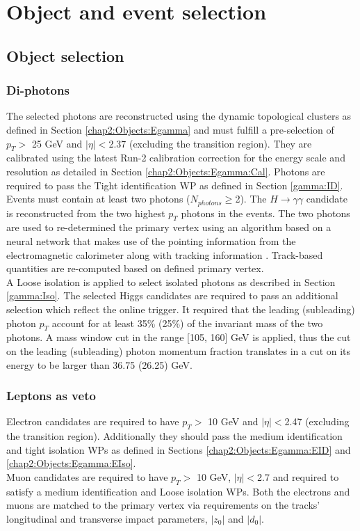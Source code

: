 \section{Object and event selection}
\label{HHyybb:ObjEvt}

\subsection{Object selection}
\label{HHyybb:ObjEvt:Obj}

\subsubsection{Di-photons}
\label{HHyybb:ObjEvt:Obj:gamma}
The selected photons are reconstructed using the dynamic topological clusters as defined in Section \ref{chap2:Objects:Egamma} and must fulfill a pre-selection of $p_T > $ 25 GeV and $|\eta| < $2.37 (excluding the transition region). They are calibrated using the latest Run-2 calibration correction for the energy scale and resolution as detailed in Section \ref{chap2:Objects:Egamma:Cal}. Photons are required to pass the Tight identification WP as defined in Section \ref{gamma:ID}. Events must contain at least two photons ($N_{photons} \geq $2). The $H\to\gamma\gamma$ candidate is reconstructed from the two highest $p_T$ photons in the events.  
The two photons are used to re-determined the primary vertex using an algorithm based on a neural network that makes use of the pointing information from the electromagnetic calorimeter along with tracking information \cite{DiPhotonVertex}. Track-based quantities are re-computed based on defined primary vertex. \\
A Loose isolation is applied to select isolated photons as described in Section \ref{gamma:Iso}.
The selected Higgs candidates are required to pass an additional selection which reflect the online trigger. It required that the leading (subleading) photon $p_T$ account for at least 35\% (25\%) of the invariant mass of the two photons. A mass window cut in the range [105, 160] GeV is applied, thus the cut on the leading (subleading) photon momentum fraction translates in a cut on its energy to be larger than 36.75 (26.25) GeV.

\subsubsection{Leptons as veto}
\label{HHyybb:ObjEvt:Obj:lepton}

Electron candidates are required to have $p_T > $ 10 GeV and $|\eta| < $2.47 (excluding the transition region). Additionally they should pass the medium identification and tight isolation WPs as defined in Sections \ref{chap2:Objects:Egamma:EID} and \ref{chap2:Objects:Egamma:EIso}. \\
Muon candidates are required to have $p_T > $ 10 GeV, $|\eta| < $2.7 and required to satisfy a medium identification and Loose isolation WPs. Both the electrons and muons are matched to the primary vertex via requirements on the tracks' longitudinal and transverse impact parameters, $|z_0|$ and $|d_0|$.

